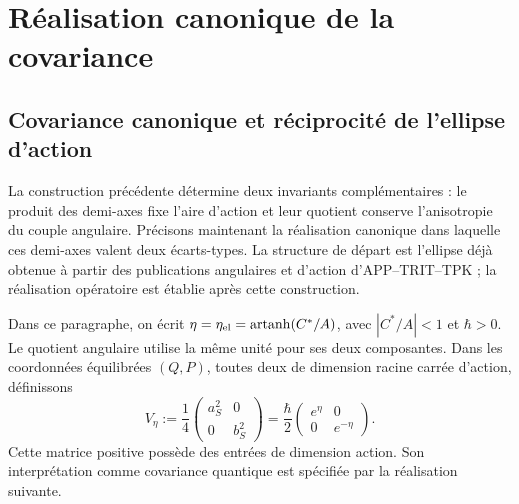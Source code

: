 \chapter{Réalisation canonique de la covariance}
\label{x_reciprocidad:nuclear:covarianza-antecedente}


\section{Covariance canonique et réciprocité de l'ellipse d'action}
\label{x_reciprocidad:sec:ii-area-covarianza}

La construction précédente détermine deux invariants complémentaires :
le produit des demi-axes fixe l'aire d'action et leur quotient conserve
l'anisotropie du couple angulaire. Précisons maintenant la réalisation canonique
dans laquelle ces demi-axes valent deux écarts-types. La structure de
départ est l'ellipse déjà obtenue à partir des publications angulaires et
d'action d'APP--TRIT--TPK ; la réalisation opératoire est établie après
cette construction.

Dans ce paragraphe, on écrit \(\eta=\eta_{\rm el}
=\operatorname{artanh}(C^*/A)\), avec \(|C^*/A|<1\) et
\(\hbar>0\). Le quotient angulaire utilise la même unité pour ses deux
composantes. Dans les coordonnées équilibrées \((Q,P)\), toutes deux de
dimension racine carrée d'action, définissons
\begin{equation}
 V_\eta:=\frac14
 \begin{pmatrix}a_S^2&0\\0&b_S^2\end{pmatrix}
 =\frac{\hbar}{2}
 \begin{pmatrix}e^\eta&0\\0&e^{-\eta}\end{pmatrix}.
 \label{x_reciprocidad:eq:ii-covarianza-geometrica}
\end{equation}
Cette matrice positive possède des entrées de dimension action. Son interprétation
comme covariance quantique est spécifiée par la réalisation suivante.

